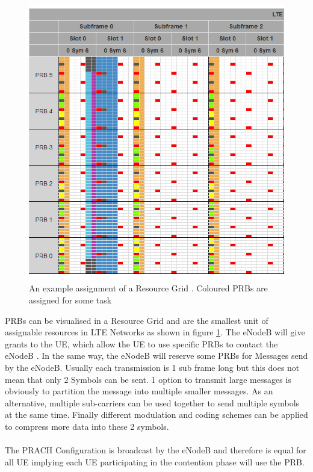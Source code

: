 \documentclass[conference]{IEEEtran}
\begin{document}
\begin{figure}
    \centering
    \includegraphics[width = \columnwidth]{../Figures/Resource_Grid1.PNG}
    \caption{An example assignment of a Resource Grid \cite{ResourceGridCalculator}. Coloured PRBs are assigned for some task}
    \label{fig:grid}
\end{figure}
PRBs can be visualised in a Resource Grid and are the smallest unit of assignable resources in LTE Networks as shown in figure \ref{fig:grid}.
The eNodeB will give grants to the UE, which allow the UE to use specific PRBs to contact the eNodeB .
In the same way, the eNodeB will reserve some PRBs for Messages send by the eNodeB.
Usually each transmission is 1 sub frame long but this does not mean that only 2 Symbols can be sent.
1 option to transmit large messages is obviously to partition the message into multiple smaller messages.
As an alternative, multiple sub-carriers can be used together to send multiple symbols at the same time.
Finally different modulation and coding schemes can be applied to compress more data into these 2 symbols.\\\\
The PRACH Configuration is broadcast by the eNodeB and therefore is equal for all UE implying each UE participating in the contention phase will use the PRB.
\end{document}
